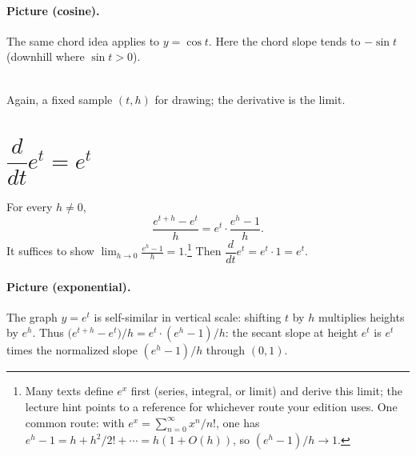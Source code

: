 \documentclass[11pt]{article}
\begin{document}
\paragraph{Picture (cosine).}
The same chord idea applies to \(y=\cos t\). Here the chord slope tends to
\(-\sin t\) (downhill where \(\sin t>0\)).

\begin{center}
\\[0.5em]
{\small Again, a fixed sample \((t,h)\) for drawing; the derivative is the limit.}
\end{center}

\section*{\(\dfrac{d}{dt}e^{t}=e^{t}\)}
For every \(h\neq 0\),
\[
\frac{e^{t+h}-e^{t}}{h}=e^{t}\cdot\frac{e^{h}-1}{h}.
\]
It suffices to show \(\displaystyle\lim_{h\to 0}\frac{e^{h}-1}{h}=1\).\footnote{Many
texts define \(e^{x}\) first (series, integral, or limit) and derive this limit; the
lecture hint points to a reference for whichever route your edition uses. One common
route: with \(e^{x}=\sum_{n=0}^{\infty}x^{n}/n!\), one has
\(e^{h}-1=h+h^{2}/2!+\cdots=h(1+O(h))\), so \((e^{h}-1)/h\to 1\).}
Then \(\dfrac{d}{dt}e^{t}=e^{t}\cdot 1=e^{t}\).

\paragraph{Picture (exponential).}
The graph \(y=e^{t}\) is self-similar in vertical scale: shifting \(t\) by \(h\)
multiplies heights by \(e^{h}\). Thus
\(\bigl(e^{t+h}-e^{t}\bigr)/h=e^{t}\cdot (e^{h}-1)/h\): the secant slope at height
\(e^{t}\) is \(e^{t}\) times the normalized slope \((e^{h}-1)/h\) through \((0,1)\).
\end{document}
